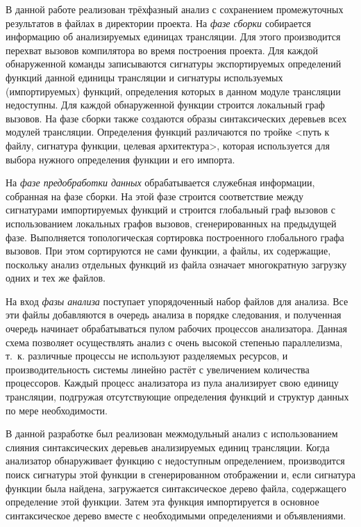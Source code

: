 В данной работе реализован трёхфазный анализ с сохранением промежуточных результатов в файлах в директории проекта. На \textit{фазе сборки} собирается информацию об анализируемых единицах трансляции. Для этого производится перехват вызовов компилятора во время построения проекта. Для каждой обнаруженной команды записываются сигнатуры экспортируемых определений функций данной единицы трансляции и сигнатуры используемых (импортируемых) функций, определения которых в данном модуле трансляции недоступны. Для каждой обнаруженной функции строится локальный граф вызовов. На фазе сборки также создаются образы синтаксических деревьев всех модулей трансляции. Определения функций различаются по тройке <путь к файлу, сигнатура функции, целевая архитектура>, которая используется для выбора нужного определения функции и его импорта.

На \textit{фазе предобработки данных} обрабатывается служебная информации, собранная на фазе сборки. На этой фазе строится соответствие между сигнатурами импортируемых функций и строится глобальный граф вызовов с использованием локальных графов вызовов, сгенерированных на предыдущей фазе. Выполняется топологическая сортировка построенного глобального графа вызовов. При этом сортируются не сами функции, а файлы, их содержащие, поскольку анализ отдельных функций из файла означает многократную загрузку одних и тех же файлов.

На вход \textit{фазы анализа} поступает упорядоченный набор файлов для анализа. Все эти файлы добавляются в очередь анализа в порядке следования, и полученная очередь начинает обрабатываться пулом рабочих процессов анализатора. Данная схема позволяет осуществлять анализ с очень высокой степенью параллелизма, т.~к. различные процессы не используют разделяемых ресурсов, и производительность системы линейно растёт с увеличением количества процессоров. Каждый процесс анализатора из пула анализирует свою единицу трансляции, подгружая отсутствующие определения функций и структур данных по мере необходимости.

В данной разработке был реализован межмодульный анализ с использованием слияния синтаксических деревьев анализируемых единиц трансляции. Когда анализатор обнаруживает функцию с недоступным определением, производится поиск сигнатуры этой функции в сгенерированном отображении и, если сигнатура функции была найдена, загружается синтаксическое дерево файла, содержащего определение этой функции. Затем эта функция импортируется в основное синтаксическое дерево вместе с необходимыми определениями и объявлениями.

